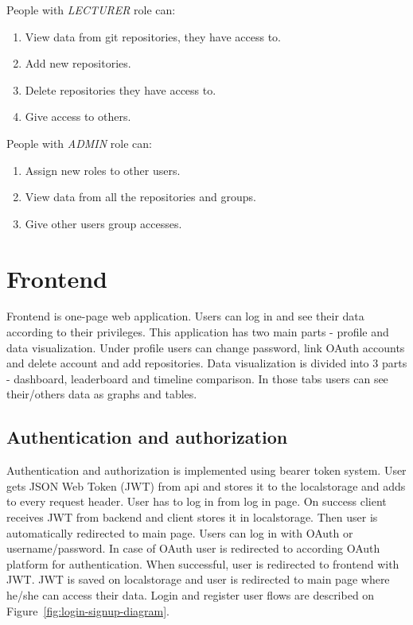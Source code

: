 People with \textit{LECTURER} role can:
\begin{enumerate}
    \item View data from git repositories, they have access to.
    \item Add new repositories.
    \item Delete repositories they have access to.
    \item Give access to others.
\end{enumerate}

People with \textit{ADMIN} role can:
\begin{enumerate}
    \item Assign new roles to other users.
    \item View data from all the repositories and groups.
    \item Give other users group accesses.
\end{enumerate}

\section{Frontend}\label{sec:frontend-content}
Frontend is one-page web application.
Users can log in and see their data according to their privileges.
This application has two main parts - profile and data visualization.
Under profile users can change password, link OAuth accounts and delete account and add repositories.
Data visualization is divided into 3 parts - dashboard, leaderboard and timeline comparison.
In those tabs users can see their/others data as graphs and tables.

\subsection{Authentication and authorization}\label{subsec:authentication-and-authorization}
Authentication and authorization is implemented using bearer token system.
User gets JSON Web Token (JWT) from api and stores it to the localstorage and adds to every request header.
User has to log in from log in page.
On success client receives JWT from backend and client stores it in localstorage.
Then user is automatically redirected to main page.
Users can log in with OAuth or username/password.
In case of OAuth user is redirected to according OAuth platform for authentication.
When successful, user is redirected to frontend with JWT.
JWT is saved on localstorage and user is redirected to main page where he/she can access their data.
Login and register user flows are described on Figure~\ref{fig:login-signup-diagram}.


